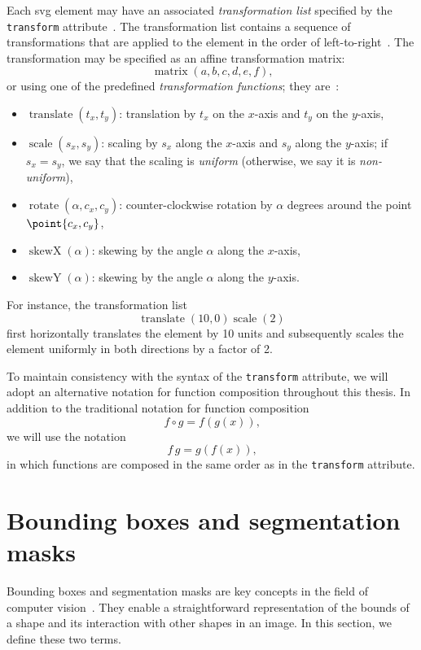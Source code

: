 Each \gls{svg} element may have an associated \emph{transformation list} specified by the \texttt{transform} attribute~\cite{svg11, svg2}. The transformation list contains a sequence of transformations that are applied to the element in the order of left-to-right~\cite[Sec.~7.4]{svg11}. The transformation may be specified as an affine transformation matrix:
\[
    \operatorname{matrix}(a, b, c, d, e, f)\text{,}
\]
or using one of the predefined \emph{transformation functions}; they are~\cite[Sec.~7.4]{svg11}:
\begin{itemize}
    \item $\operatorname{translate}\left(t_x, t_y\right)$: translation by $t_x$ on the $x$-axis and $t_y$ on the $y$-axis,
    \item $\operatorname{scale}\left(s_x, s_y\right)$: scaling by $s_x$ along the $x$-axis and $s_y$ along the $y$-axis; if $s_x = s_y$, we say that the scaling is \emph{uniform} (otherwise, we say it is \emph{non-uniform}),
    \item $\operatorname{rotate}\left(\alpha, c_x, c_y\right)$: counter-clockwise rotation by $\alpha$ degrees around the point $\point{c_x, c_y}$,
    \item $\operatorname{skewX}\left(\alpha\right)$: skewing by the angle $\alpha$ along the $x$-axis,
    \item $\operatorname{skewY}\left(\alpha\right)$: skewing by the angle $\alpha$ along the $y$-axis.
\end{itemize}

For instance, the transformation list
\[
    \operatorname{translate}(10, 0)\operatorname{scale}(2)
\]
first horizontally translates the element by 10 units and subsequently scales the element uniformly in both directions by a factor of 2.

To maintain consistency with the syntax of the \texttt{transform} attribute, we will adopt an alternative notation for function composition throughout this thesis. In addition to the traditional notation for function composition
\[     
    f \circ g = f(g(x))\text{,} 
\]
we will use the notation
\[
    f\,g = g(f(x))\text{,}
\]
in which functions are composed in the same order as in the \texttt{transform} attribute.

\section{Bounding boxes and segmentation masks}

Bounding boxes and segmentation masks are key concepts in the field of computer vision~\cite{smartone2024boundingboxes, agosta_segmentation_mask_visualization, lowe2022segmentation}. They enable a straightforward representation of the bounds of a shape and its interaction with other shapes in an image. In this section, we define these two terms.

